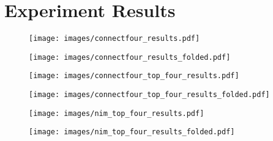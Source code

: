 \newpage
\section{Experiment Results}
\label{appendix:results}

\begin{figure}[H]
    \centering
    \texttt{[image: images/connectfour\_results.pdf]}
    \caption{}
    \label{fig:c4_results}
\end{figure}

\begin{figure}[H]
    \centering
    \texttt{[image: images/connectfour\_results\_folded.pdf]}
    \caption{}
    \label{fig:c4_results_folded}
\end{figure}

\begin{figure}[H]
    \centering
    \texttt{[image: images/connectfour\_top\_four\_results.pdf]}
    \caption{}
    \label{fig:c4_top_four_results}
\end{figure}

\begin{figure}[H]
    \centering
    \texttt{[image: images/connectfour\_top\_four\_results\_folded.pdf]}
    \caption{}
    \label{fig:c4_top_four_results_folded}
\end{figure}

\begin{figure}[H]
    \centering
    \texttt{[image: images/nim\_top\_four\_results.pdf]}
    \caption{}
    \label{fig:nim_top_four_results}
\end{figure}

\begin{figure}[H]
    \centering
    \texttt{[image: images/nim\_top\_four\_results\_folded.pdf]}
    \caption{}
    \label{fig:nim_top_four_results_folded}
\end{figure}